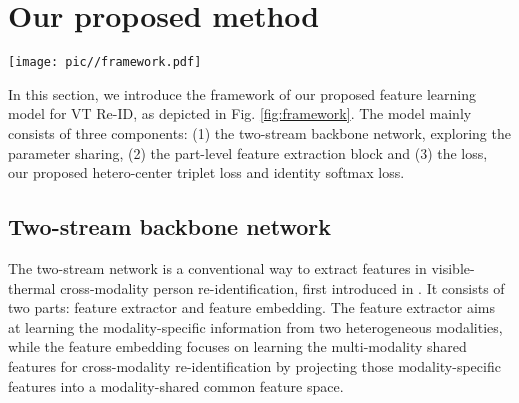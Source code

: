 \documentclass[journal]{IEEEtran}
\begin{document}
\section{Our proposed method}
\label{sec:method}
\begin{figure*}
\centering
\texttt{[image: pic//framework.pdf]}
\caption{The pipeline of our proposed framework for VT Re-ID, which mainly contains three components: two-stream backbone network, part-level feature learning block and loss. The two-stream backbone network includes two modality-specific branches with independent parameters and follows one modality-shared branch with shared parameters. For example, we take the ResNet50 model as the backbone, the first two stages ( and ) form the modality-specific branches and the following three stages (,  and ) form the modality-shared branch.
Then, the feature map outputted from the backbone is horizontally split into  3D tensors, here , which are pooled into vectors by generalized-mean () pooling operation. For each part vector, a  Conv block reduces the dimension of features. Afterward, the reduced part features are respectively input to compute the identification loss  and our proposed hetero-center triplet loss . Finally, all the part features are concatenated () to form the final person features, which is supervised by . }
\label{fig:framework}
\end{figure*}
In this section, we introduce the framework of our proposed feature learning model for VT Re-ID, as depicted in Fig. \ref{fig:framework}. The model mainly consists of three components: (1) the two-stream backbone network, exploring the parameter sharing, (2) the part-level feature extraction block and (3) the loss, our proposed hetero-center triplet loss and identity softmax loss.

\subsection{Two-stream backbone network}
\label{ssec:backbone}
The two-stream network is a conventional way to extract features in visible-thermal cross-modality person re-identification, first introduced in \cite{ye2018visible}. It consists of two parts: feature extractor and feature embedding. The feature extractor aims at learning the modality-specific information from two heterogeneous modalities, while the feature embedding focuses on learning the multi-modality shared features for cross-modality re-identification by projecting those modality-specific features into a modality-shared common feature space.
\end{document}
